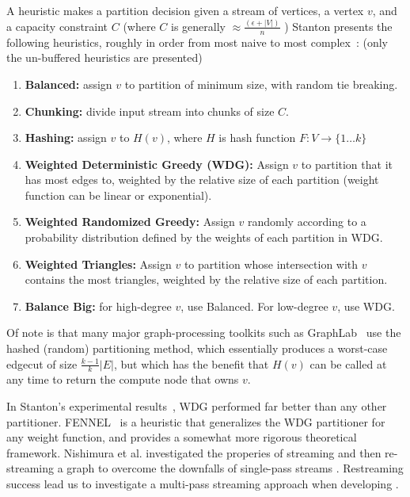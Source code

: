 A heuristic makes a partition decision given a stream of vertices, a vertex $v$, and a capacity constraint $C$ (where $C$ is generally $\approx \frac{(\epsilon+|V|)}{n}$ )
Stanton presents the following heuristics, roughly in order from most naive to most complex~\cite{Stanton:2012:SGP:2339530.2339722}: (only the un-buffered heuristics are presented)

\begin{enumerate}
\item \textbf{Balanced:} assign $v$ to partition of minimum size, with random tie breaking.
\item \textbf{Chunking:} divide input stream into chunks of size $C$.
\item \textbf{Hashing:} assign $v$ to $H(v)$, where $H$ is hash function $F:V\to\{1\dots k\}$
\item \textbf{Weighted Deterministic Greedy (WDG):} Assign $v$ to partition that it has most edges to, weighted by the relative size of each partition (weight function can be linear or exponential).
\item \textbf{Weighted Randomized Greedy:} Assign $v$ randomly according to a probability distribution defined by the weights of each partition in WDG.
\item \textbf{Weighted Triangles:} Assign $v$ to partition whose intersection with $v$ contains the most triangles, weighted by the relative size of each partition.
\item \textbf{Balance Big:} for high-degree $v$, use Balanced. For low-degree $v$, use WDG.
\end{enumerate}

Of note is that many major graph-processing toolkits such as GraphLab~\cite{Low:2012:DGF:2212351.2212354} use the hashed (random) partitioning method, which essentially produces a worst-case edgecut of size $\frac{k-1}{k}|E|$, but which has the benefit that $H(v)$ can be called at any time to return the compute node that owns $v$.

In Stanton's experimental results~\cite{Stanton:2012:SGP:2339530.2339722}, WDG performed far better than any other partitioner.
FENNEL~\cite{tsourakakis2012fennel} is a heuristic that generalizes the WDG partitioner for any weight function, and provides a somewhat more rigorous theoretical framework.
Nishimura et al. investigated the properies of streaming and then re-streaming a graph to overcome the downfalls of single-pass streams \cite{nishimura2013restream}.
Restreaming success lead us to investigate a multi-pass streaming approach when developing \ourmethod.
